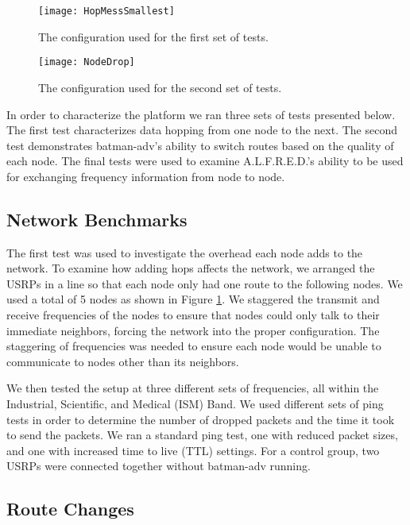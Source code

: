 \begin{figure}
	\centering
	\texttt{[image: HopMessSmallest]}
	\caption{The configuration used for the first set of tests.}
	\label{fig:HopMess}
\end{figure}

\begin{figure}
	\centering
	\texttt{[image: NodeDrop]}
	\caption{The configuration used for the second set of tests.}
	\label{fig:NodeDrop}
\end{figure}

In order to characterize the platform we ran three sets of tests presented below. The first test characterizes data hopping from one node to the next. The second test demonstrates batman-adv's ability to switch routes based on the quality of each node. The final tests were used to examine A.L.F.R.E.D.'s ability to be used for exchanging frequency information from node to node. 

\subsection{Network Benchmarks}

The first test was used to investigate the overhead each node adds to the network. To examine how adding hops affects the network, we arranged the USRPs in a line so that each node only had one route to the following nodes.  We used a total of 5 nodes as shown in Figure \ref{fig:HopMess}. We staggered the transmit and receive frequencies of the nodes to ensure that nodes could only talk to their immediate neighbors, forcing the network into the proper configuration. The staggering of frequencies was needed to ensure each node would be unable to communicate to nodes other than its neighbors. 

 We then tested the setup at three different sets of frequencies, all within the Industrial, Scientific, and Medical (ISM) Band. We used different sets of ping tests in order to determine the number of dropped packets and the time it took to send the packets. We ran a standard ping test, one with reduced packet sizes, and one with increased time to live (TTL) settings. For a control group, two USRPs were connected together without batman-adv running. 


\subsection{Route Changes}

